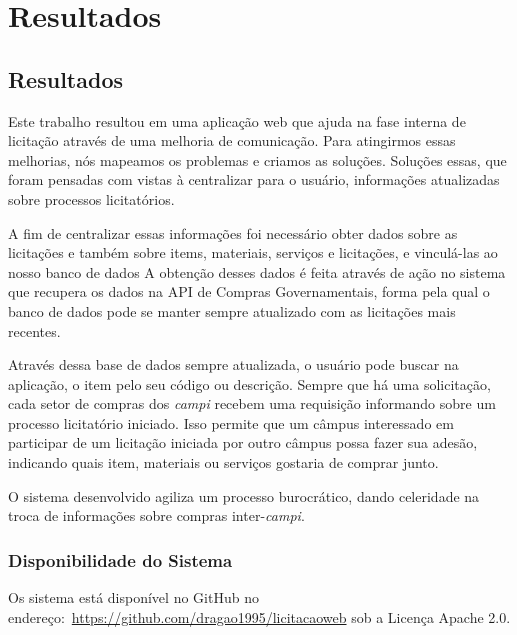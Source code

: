 \part{Resultados}

\chapter[Resultados]{Resultados}\label{Capitulo5}

Este trabalho resultou em uma aplicação web que ajuda na fase interna de licitação através de uma melhoria de comunicação.
Para atingirmos essas melhorias, nós mapeamos os problemas e criamos as soluções.
Soluções essas, que foram pensadas com vistas à centralizar para o usuário, informações atualizadas sobre processos licitatórios.

A fim de centralizar essas informações foi necessário obter dados sobre as licitações e também sobre items, materiais, serviços e licitações, e vinculá-las ao nosso banco de dados
A obtenção desses dados é feita através de ação no sistema que recupera os dados na API de Compras Governamentais, forma pela qual o banco de dados pode se manter sempre atualizado com as licitações mais recentes.

Através dessa base de dados sempre atualizada, o usuário pode buscar na aplicação, o item pelo seu código ou descrição.
Sempre que há uma solicitação, cada setor de compras dos \textit{campi} recebem uma requisição informando sobre um processo licitatório iniciado.
Isso permite que um câmpus interessado em participar de um licitação iniciada por outro câmpus possa fazer sua adesão, indicando quais item, materiais ou serviços gostaria de comprar junto.

O sistema desenvolvido agiliza um processo burocrático, dando celeridade na troca de informações sobre compras inter-\textit{campi}.


\section{Disponibilidade do Sistema}

Os sistema está disponível no GitHub no endereço:~\url{https://github.com/dragao1995/licitacaoweb} sob a Licença Apache 2.0.



